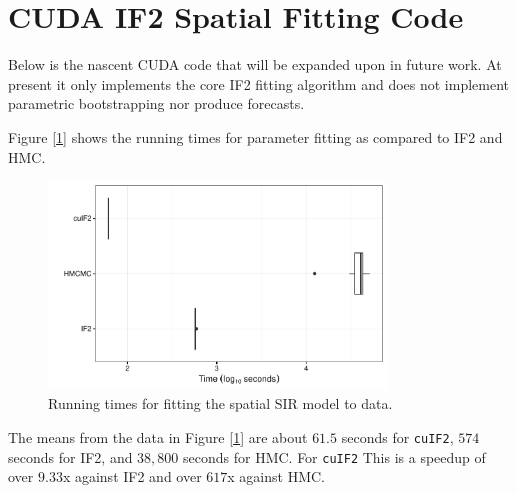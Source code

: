 \section{CUDA IF2 Spatial Fitting Code}

	Below is the nascent CUDA code that will be expanded upon in future work. At present it only implements the core IF2 fitting algorithm and does not implement parametric bootstrapping nor produce forecasts.

	

	Figure [\ref{cudatimeplot2}] shows the running times for parameter fitting as compared to IF2 and HMC.

	\begin{figure}[H]
        \centering
        \captionsetup{width=.8\linewidth}
        \includegraphics[width=0.8\textwidth]{./images/timeplot2.pdf}
        \caption{Running times for fitting the spatial SIR model to data. \label{cudatimeplot2}}
    \end{figure}

    The means from the data in Figure [\ref{cudatimeplot2}] are about $61.5$ seconds for \texttt{cuIF2}, $574$ seconds for IF2, and $38,800$ seconds for HMC. For \texttt{cuIF2} This is a speedup of over $9.33$x against IF2 and over $617$x against HMC.

